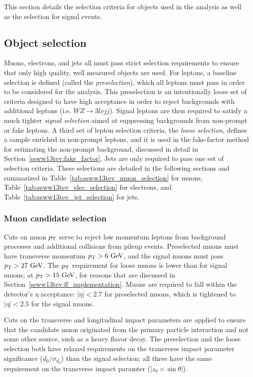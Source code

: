 This section details the selection criteria for objects used in the analysis as well as the selection for signal events.

\subsection{Object selection}\label{ssww13tev:object_selection}
Muons, electrons, and jets all must pass strict selection requirements to ensure that only high quality, well measured objects are used.
For leptons, a baseline selection is defined (called the \emph{preselection}), which all leptons must pass in order to be considered for the analysis.
This preselection is an intentionally loose set of criteria designed to have high acceptance in order to reject backgrounds with additional leptons (i.e. $WZ\rightarrow 3l\nu jj$).
Signal leptons are then required to satisfy a much tighter \emph{signal selection} aimed at suppressing backgrounds from non-prompt or fake leptons.
A third set of lepton selection criteria, the \emph{loose selection}, defines a sample enriched in non-prompt leptons, and it is used in the fake-factor method for estimating the non-prompt background, discussed in detail in Section~\ref{ssww13tev:fake_factor}.
Jets are only required to pass one set of selection criteria.
These selections are detailed in the following sections and summarized in Table~\ref{tab:ssww13tev_muon_selection} for muons, Table~\ref{tab:ssww13tev_elec_selection} for electrons, and Table~\ref{tab:ssww13tev_jet_selection} for jets.

\subsubsection{Muon candidate selection}
Cuts on muon $p_{\mathrm{T}}$ serve to reject low momentum leptons from background processes and additional collisions from pileup events.
Preselected muons must have transverse momentum $\pt > 6\gev$, and the signal muons must pass $\pt > 27\gev$.
The $p_{\mathrm{T}}$ requirement for loose muons is lower than for signal muons, at $\pt > 15\gev$, for reasons that are discussed in Section~\ref{ssww13tev:ff_implementation}.
Muons are required to fall within the detector's $\eta$ acceptance: $|\eta| < 2.7$ for preselected muons, which is tightened to $|\eta| < 2.5$ for the signal muons.

Cuts on the transverse and longitudinal impact parameters are applied to ensure that the candidate muon originated from the primary particle interaction and not some other source, such as a heavy flavor decay.
The preselection and the loose selection both have relaxed requirements on the transverse impact parameter significance ($d_0/\sigma_{d_{0}}$) than the signal selection; all three have the same requirement on the transverse impact paramter ($|z_0\times\sin\theta|$).

